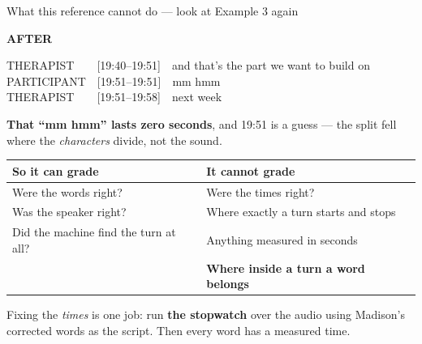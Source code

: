 \documentclass[aspectratio=169]{beamer}
\newcommand{\keybox}[1]{%
  \par\vspace{4pt}\begingroup\centering
  \colorbox{warmbg}{\parbox{0.93\textwidth}{\centering #1}}%
  \par\endgroup\vspace{2pt}}
\newenvironment{nicetable}[1]
  {\par\vspace{2pt}\begingroup\centering\small
   \renewcommand{\arraystretch}{1.18}%
   \setlength{\tabcolsep}{6pt}\rowcolors{2}{band}{white}%
   \begin{tabular}{#1}\arrayrulecolor{hdr}\toprule}
  {\bottomrule\end{tabular}\par\endgroup\vspace{2pt}}
\newcommand{\after}[1]{%
  \par\vspace{2pt}\begingroup\centering
  {\footnotesize\textcolor{good}{\textbf{AFTER}}}\par\vspace{1pt}
  \colorbox{band}{\parbox{0.90\textwidth}{\ttfamily\footnotesize #1}}%
  \par\endgroup\vspace{3pt}}
\newcommand{\hd}[1]{\textcolor{hdr}{\textbf{#1}}}
\newcommand{\timer}{\textbf{the stopwatch}}
\begin{document}
\begin{frame}{What this reference cannot do --- look at Example 3 again}

\after{THERAPIST~~~~[19:40--19:51]~~and that's the part we want to build on\\
PARTICIPANT~~[19:51--19:51]~~mm hmm\\
THERAPIST~~~~[19:51--19:58]~~next week}

\vspace{0.1em}
\textbf{That ``mm hmm'' lasts zero seconds}, and 19:51 is a guess --- the split fell where
the \emph{characters} divide, not the sound.

\begin{nicetable}{p{6.0cm}p{6.4cm}}
\hd{So it can grade} & \hd{It cannot grade} \\ \midrule
Were the words right? & Were the times right? \\
Was the speaker right? & Where exactly a turn starts and stops \\
Did the machine find the turn at all? & Anything measured in seconds \\
 & \textbf{Where inside a turn a word belongs} \\
\end{nicetable}

\keybox{Fixing the \emph{times} is one job: run \timer{} over the audio using Madison's
corrected words as the script. Then every word has a measured time.}

\end{frame}
\end{document}
